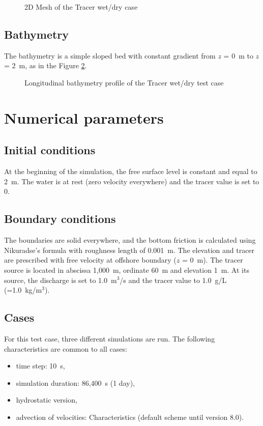 \begin{figure}[H]
  \centering
  \caption{2D Mesh of the Tracer wet/dry case}\label{fig:tracerwetdry:Mesh}
\end{figure}

\subsection{Bathymetry}
%
The bathymetry is a simple sloped bed with constant gradient from $z$ = 0~m to $z$ = 2~m, as in the Figure \ref{fig:tracerwetdry:bathy1D}.
\begin{figure}[H]
  \centering
  \caption{Longitudinal bathymetry profile of the Tracer wet/dry test case}\label{fig:tracerwetdry:bathy1D}
\end{figure}

%

\section{Numerical parameters}

\subsection{Initial conditions}
At the beginning of the simulation, the free surface level is constant and equal to 2~m.
The water is at rest (zero velocity everywhere) and the tracer value is set to 0.
%
\subsection{Boundary conditions}
The boundaries are solid everywhere, and the bottom friction is calculated using Nikuradse's formula
with roughness length of 0.001~m. The elevation and tracer are prescribed with free
velocity at offshore boundary ($z$ = 0~m). The tracer source is located in abscissa 1,000~m,
ordinate 60~m and elevation 1~m. At its source, the discharge is set to 1.0~m$^3$/s
and the tracer value to 1.0~g/L (=1.0~kg/m$^3$).

\subsection{Cases}
%
For this test case, three different simulations are run. The following characteristics are common to all cases:\\
\begin{itemize}
\itemsep0em
\item time step: 10~s,
\item simulation duration: 86,400~s (1 day),
\item hydrostatic version,
\item advection of velocities: Characteristics (default scheme until version 8.0).
\end{itemize}

